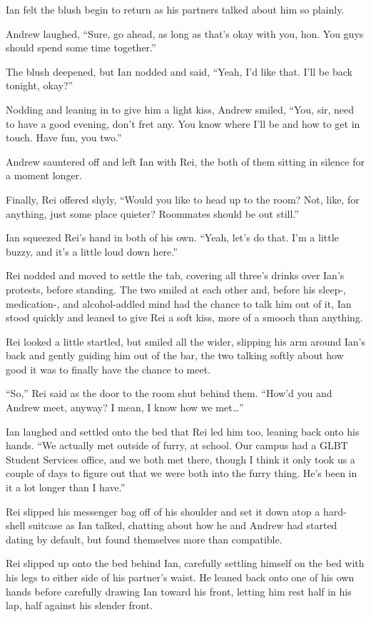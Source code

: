 Ian felt the blush begin to return as his partners talked about him so plainly.

Andrew laughed, ``Sure, go ahead, as long as that's okay with you, hon. You guys should spend some time together.''

The blush deepened, but Ian nodded and said, ``Yeah, I'd like that. I'll be back tonight, okay?''

Nodding and leaning in to give him a light kiss, Andrew smiled, ``You, sir, need to have a good evening, don't fret any. You know where I'll be and how to get in touch. Have fun, you two.''

Andrew sauntered off and left Ian with Rei, the both of them sitting in silence for a moment longer.

Finally, Rei offered shyly, ``Would you like to head up to the room? Not, like, for anything, just some place quieter? Roommates should be out still.''

Ian squeezed Rei's hand in both of his own. ``Yeah, let's do that. I'm a little buzzy, and it's a little loud down here.''

Rei nodded and moved to settle the tab, covering all three's drinks over Ian's protests, before standing. The two smiled at each other and, before his sleep-, medication-, and alcohol-addled mind had the chance to talk him out of it, Ian stood quickly and leaned to give Rei a soft kiss, more of a smooch than anything.

Rei looked a little startled, but smiled all the wider, slipping his arm around Ian's back and gently guiding him out of the bar, the two talking softly about how good it was to finally have the chance to meet.

``So,'' Rei said as the door to the room shut behind them. ``How'd you and Andrew meet, anyway? I mean, I know how we met\ldots{}''

Ian laughed and settled onto the bed that Rei led him too, leaning back onto his hands. ``We actually met outside of furry, at school. Our campus had a GLBT Student Services office, and we both met there, though I think it only took us a couple of days to figure out that we were both into the furry thing. He's been in it a lot longer than I have.''

Rei slipped his messenger bag off of his shoulder and set it down atop a hard-shell suitcase as Ian talked, chatting about how he and Andrew had started dating by default, but found themselves more than compatible.

Rei slipped up onto the bed behind Ian, carefully settling himself on the bed with his legs to either side of his partner's waist. He leaned back onto one of his own hands before carefully drawing Ian toward his front, letting him rest half in his lap, half against his slender front.

